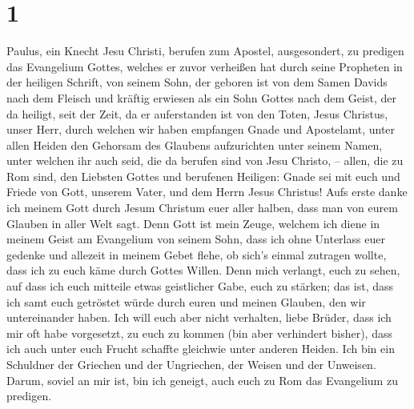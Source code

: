 \hypertarget{section}{%
\section{1}\label{section}}

 Paulus, ein Knecht Jesu Christi, berufen zum Apostel,
ausgesondert, zu predigen das Evangelium Gottes,  welches
er zuvor verheißen hat durch seine Propheten in der heiligen Schrift,
 von seinem Sohn, der geboren ist von dem Samen Davids
nach dem Fleisch  und kräftig erwiesen als ein Sohn Gottes
nach dem Geist, der da heiligt, seit der Zeit, da er auferstanden ist
von den Toten, Jesus Christus, unser Herr,  durch welchen
wir haben empfangen Gnade und Apostelamt, unter allen Heiden den
Gehorsam des Glaubens aufzurichten unter seinem Namen, 
unter welchen ihr auch seid, die da berufen sind von Jesu Christo, --
 allen, die zu Rom sind, den Liebsten Gottes und berufenen
Heiligen: Gnade sei mit euch und Friede von Gott, unserem Vater, und dem
Herrn Jesus Christus!  Aufs erste danke ich meinem Gott
durch Jesum Christum euer aller halben, dass man von eurem Glauben in
aller Welt sagt.  Denn Gott ist mein Zeuge, welchem ich
diene in meinem Geist am Evangelium von seinem Sohn, dass ich ohne
Unterlass euer gedenke  und allezeit in meinem Gebet
flehe, ob sich's einmal zutragen wollte, dass ich zu euch käme durch
Gottes Willen.  Denn mich verlangt, euch zu sehen, auf
dass ich euch mitteile etwas geistlicher Gabe, euch zu stärken;
 das ist, dass ich samt euch getröstet würde durch euren
und meinen Glauben, den wir untereinander haben.  Ich
will euch aber nicht verhalten, liebe Brüder, dass ich mir oft habe
vorgesetzt, zu euch zu kommen (bin aber verhindert bisher), dass ich
auch unter euch Frucht schaffte gleichwie unter anderen Heiden.
 Ich bin ein Schuldner der Griechen und der Ungriechen,
der Weisen und der Unweisen.  Darum, soviel an mir ist,
bin ich geneigt, auch euch zu Rom das Evangelium zu predigen.

